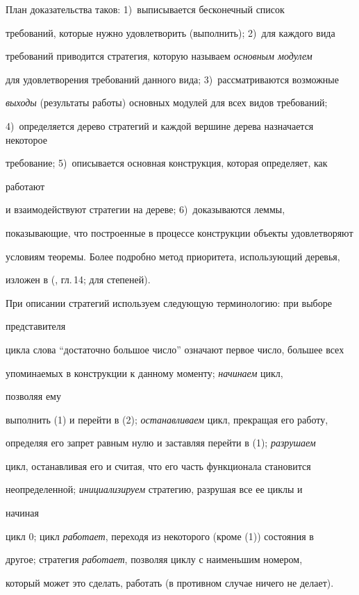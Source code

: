План доказательства таков: 1)~выписывается бесконечный список


требований, которые нужно удовлетворить (выполнить); 2)~для каждого вида 


требований приводится стратегия, которую называем {\it основным модулем}


для удовлетворения требований данного вида; 3)~рассматриваются возможные


{\it выходы} (результаты работы) основных модулей для всех видов требований;


4)~определяется дерево стратегий и каждой вершине дерева назначается некоторое 


требование; 5)~описывается основная конструкция, которая определяет, как 


работают


и взаимодействуют стратегии на дереве; 6)~доказываются леммы,


показывающие, что построенные в процессе конструкции объекты удовлетворяют


условиям теоремы. Более подробно метод приоритета, использующий деревья,


изложен в (\cite{So}, гл.\,14; \cite{CLW} для \pp степеней).





При описании стратегий используем следующую терминологию: при выборе 


представителя


цикла слова ``достаточно большое число'' означают первое число, большее всех


упоминаемых в конструкции к данному моменту; {\it начинаем\/} цикл, 


позволяя ему


выполнить (1) и перейти в (2); {\it останавливаем} цикл, прекращая его работу,


определяя его запрет равным нулю и заставляя перейти в (1); {\it разрушаем}


цикл, останавливая его и считая, что его часть функционала становится 


неопределенной; {\it инициализируем} стратегию, разрушая все ее циклы и 


начиная


цикл 0; цикл {\it работает}, переходя из некоторого (кроме (1)) состояния в


другое; стратегия {\it работает}, позволяя циклу с наименьшим номером, 


который может это сделать, работать (в противном случае ничего не делает).






